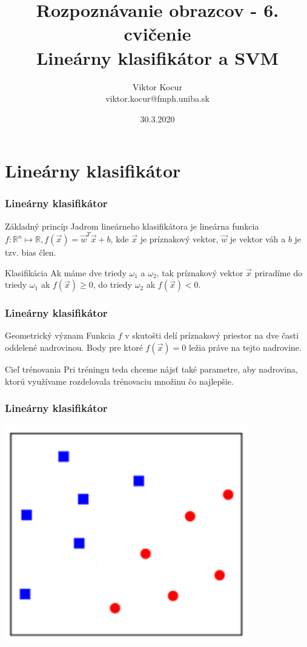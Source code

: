 \documentclass{beamer}
\title[PCA a LDA]{Rozpoznávanie obrazcov - 6. cvičenie \\ Lineárny klasifikátor a SVM}
\author[Viktor Kocur]{Viktor Kocur \\{\small viktor.kocur@fmph.uniba.sk}}
\institute{DAI FMFI UK}
\date{30.3.2020}
\begin{document}

\begin{frame}[plain]
  \titlepage  
\end{frame}

\section{Lineárny klasifikátor}

\begin{frame}
\frametitle{Lineárny klasifikátor}
\begin{block}{Základný princíp}
Jadrom lineárneho klasifikátora je lineárna funkcia $f : \mathbb{R}^n \mapsto \mathbb{R}, f(\vec{x}) = \vec{w}^T \vec{x} + b$, kde $\vec{x}$ je príznakový vektor, $\vec{w}$ je vektor váh a $b$ je tzv. bias člen.
\end{block}

\begin{block}{Klasifikácia}
Ak máme dve triedy $\omega_1$ a $\omega_2$, tak príznakový vektor $\vec{x}$ priradíme do triedy $\omega_1$ ak $f(\vec{x}) \ge 0$, do triedy $\omega_2$ ak $f(\vec{x}) < 0$.
\end{block}
\end{frame}



\begin{frame}
\frametitle{Lineárny klasifikátor}
\begin{block}{Geometrický význam}
Funkcia $f$ v skutošti delí príznakový priestor na dve časti oddelené nadrovinou. Body pre ktoré $f(\vec{x}) = 0$ ležia práve na tejto nadrovine. 
\end{block}

\begin{block}{Cieľ trénovania}
Pri tréningu teda chceme nájsť také parametre, aby nadrovina, ktorú využívame rozdelovala trénovaciu množinu čo najlepšie.
\end{block}
\end{frame}


\begin{frame}
\frametitle{Lineárny klasifikátor}
\center
\includegraphics[width=0.8\textwidth]{lc1.png}
\end{frame}
\end{document}
